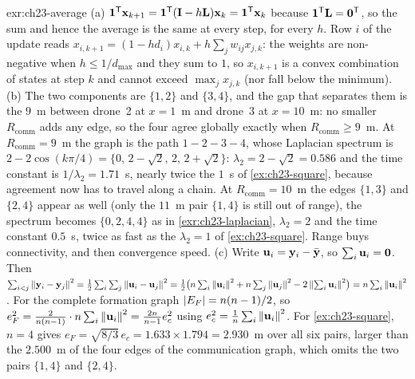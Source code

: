 \begin{solution}{exr:ch23-average}
(a) $\mathbf{1}^{\mathsf{T}}\mathbf{x}_{k+1}=\mathbf{1}^{\mathsf{T}}(\mathbf{I}-h\mathbf{L})\mathbf{x}_k=\mathbf{1}^{\mathsf{T}}\mathbf{x}_k$ because $\mathbf{1}^{\mathsf{T}}\mathbf{L}=\mathbf{0}^{\mathsf{T}}$, so the sum and hence the average is the same at every step, for every $h$. Row $i$ of the update reads $x_{i,k+1}=(1-h d_i)x_{i,k}+h\sum_j w_{ij}x_{j,k}$: the weights are non-negative when $h\le 1/d_{\max}$ and they sum to $1$, so $x_{i,k+1}$ is a convex combination of states at step $k$ and cannot exceed $\max_j x_{j,k}$ (nor fall below the minimum). (b) The two components are $\{1,2\}$ and $\{3,4\}$, and the gap that separates them is the $9$~m between drone~2 at $x=1$~m and drone~3 at $x=10$~m: no smaller $R_{\mathrm{comm}}$ adds any edge, so the four agree globally exactly when $R_{\mathrm{comm}}\ge 9$~m. At $R_{\mathrm{comm}}=9$~m the graph is the path $1-2-3-4$, whose Laplacian spectrum is $2-2\cos(k\pi/4)=\{0,\,2-\sqrt2,\,2,\,2+\sqrt2\}$: $\lambda_2=2-\sqrt2=0.586$ and the time constant is $1/\lambda_2=1.71$~s, nearly twice the $1$~s of \cref{ex:ch23-square}, because agreement now has to travel along a chain. At $R_{\mathrm{comm}}=10$~m the edges $\{1,3\}$ and $\{2,4\}$ appear as well (only the $11$~m pair $\{1,4\}$ is still out of range), the spectrum becomes $\{0,2,4,4\}$ as in \cref{exr:ch23-laplacian}, $\lambda_2=2$ and the time constant $0.5$~s, twice as fast as the $\lambda_2=1$ of \cref{ex:ch23-square}. Range buys connectivity, and then convergence speed. (c) Write $\mathbf{u}_i=\mathbf{y}_i-\bar{\mathbf{y}}$, so $\sum_i\mathbf{u}_i=\mathbf{0}$. Then $\sum_{i<j}\left\lVert \mathbf{y}_i-\mathbf{y}_j \right\rVert^2=\tfrac12\sum_i\sum_j\left\lVert \mathbf{u}_i-\mathbf{u}_j \right\rVert^2=\tfrac12\bigl(n\sum_i\left\lVert \mathbf{u}_i \right\rVert^2+n\sum_j\left\lVert \mathbf{u}_j \right\rVert^2-2\left\lVert \sum_i\mathbf{u}_i \right\rVert^2\bigr)=n\sum_i\left\lVert \mathbf{u}_i \right\rVert^2$. For the complete formation graph $\left\lvert E_F \right\rvert=n(n-1)/2$, so $e_F^2=\frac{2}{n(n-1)}\cdot n\sum_i\left\lVert \mathbf{u}_i \right\rVert^2=\frac{2n}{n-1}e_c^2$ using $e_c^2=\frac1n\sum_i\left\lVert \mathbf{u}_i \right\rVert^2$. For \cref{ex:ch23-square}, $n=4$ gives $e_F=\sqrt{8/3}\,e_c=1.633\times1.794=2.930$~m over all six pairs, larger than the $2.500$~m of the four edges of the communication graph, which omits the two pairs $\{1,4\}$ and $\{2,4\}$.
\end{solution}

